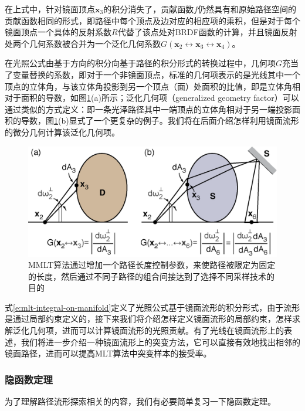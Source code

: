 \noindent 在上式中，针对镜面顶点$\mathbf{x}_3$的积分消失了，贡献函数$f$仍然具有和原始路径空间的贡献函数相同的形式，即路径中每个顶点及边对应的相应项的乘积，但是对于每个镜面顶点一个具体的反射系数$R$代替了该点处对BRDF函数的计算，并且镜面反射处两个几何系数被合并为一个泛化几何系数$G(\mathbf{x}_2\leftrightarrow\mathbf{x}_3\leftrightarrow\mathbf{x}_4)$。

在光照公式由基于方向的积分向基于路径的积分形式的转换过程中，几何项$G$充当了变量替换的系数，即对于一个非镜面顶点，标准的几何项表示的是光线其中一个顶点的立体角，与该立体角投影到另一个顶点（面）处面积的比值，即是立体角相对于面积的导数，如图\ref{f:mlt-generalized-geometry-factor}(a)所示；泛化几何项（generalized geometry factor）可以通过类似的方式定义：即一条光泽路径其中一端顶点的立体角相对于另一端投影面积的导数，图\ref{f:mlt-generalized-geometry-factor}(b)显式了一个更复杂的例子。我们将在后面介绍怎样利用镜面流形的微分几何计算该泛化几何项。

\begin{figure}
	\includegraphics[width=\textwidth]{figures/mlt/generalized-geometry-factor}
	\caption{MMLT算法通过增加一个路径长度控制参数，来使路径被限定为固定的长度，然后通过不同子路径的组合间接达到了选择不同采样技术的目的}
	\label{f:mlt-generalized-geometry-factor}
\end{figure}

式\ref{e:mlt-integral-on-manifold}定义了光照公式基于镜面流形的积分形式，由于流形是通过局部约束定义的，接下来我们将介绍怎样定义镜面流形的局部约束，怎样求解泛化几何项，进而可以计算镜面流形的光照贡献。有了光线在镜面流形上的表述，我们将进一步介绍一种镜面流形上的突变方法，它可以直接有效地找出相邻的镜面路径，进而可以提高MLT算法中突变样本的接受率。




\subsubsection{隐函数定理}\label{sec:mlt-implicit-function-throrem}
为了理解路径流形探索相关的内容，我们有必要简单复习一下隐函数定理。


